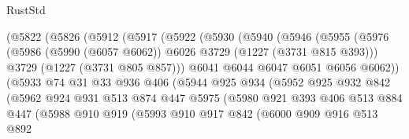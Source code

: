 \begin{lexlean}{RustStd}
\begin{coremodule}
                (@5822
                  (@5826
                    (@5912
                      (@5917
                        (@5922
                          (@5930
                            (@5940
                              (@5946
                                (@5955
                                  (@5976
                                    (@5986
                                      (@5990 (@6057 @6062))
                                      @6026
                                      @3729
                                      (@1227 (@3731 @815 @393)))
                                    @3729
                                    (@1227 (@3731 @805 @857)))
                                  @6041
                                  @6044
                                  @6047
                                  @6051
                                  @6056
                                  @6062))
                              (@5933
                                @74
                                @31
                                @33
                                @936
                                @406
                                (@5944
                                  @925
                                  @934
                                  (@5952
                                    @925
                                    @932
                                    @842
                                    (@5962
                                      @924
                                      @931
                                      @513
                                      @874
                                      @447
                                      @5975
                                      (@5980
                                        @921
                                        @393
                                        @406
                                        @513
                                        @884
                                        @447
                                        (@5988
                                          @910
                                          @919
                                          (@5993
                                            @910
                                            @917
                                            @842
                                            (@6000
                                              @909
                                              @916
                                              @513
                                              @892

\end{coremodule}
\end{lexlean}
